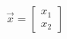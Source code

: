 \documentclass[preview]{standalone}
\begin{document}
\begin{align*}
\vec{x} = \begin{bmatrix} x_1 \\ x_2 \end{bmatrix}
\end{align*}
\end{document}
